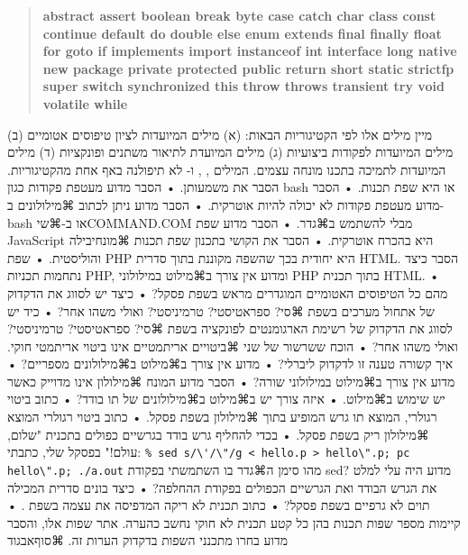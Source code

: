 \begin{quote}
\setLTR
\listingsfont\bfseries
abstract assert boolean break byte case catch char class const continue
default do double else enum extends final finally float for goto if
implements import instanceof int interface long native new package private
protected public return short static strictfp super switch synchronized
this throw throws transient try void volatile while
\end{quote}
מיין מילים אלו לפי הקטיגוריות הבאות: (א) מילים המיועדות לציון טיפוסים אטומיים (ב) מילים המיועדות לפקודות ביצועיות (ג) מילים המיועדת לתיאור משתנים ופונקציות (ד) מילים המיועדות לתמיכה בתכנו מונחה עצמים. המילים , ,  ו- לא תיפולנה באף אחת מהקטיגוריות. הסבר את משמעותן.
• הסבר מדוע מעטפת פקודות כגון bash או  היא שפת תכנות.
• הסבר מדוע מעטפת פקודות לא יכולה להיות אוטרקית.
• הסבר מדוע ניתן לכתוב ⌘מילולונים ב-bash או ב-⌘שי{COMMAND.COM} מבלי להשתמש ב⌘גדר.
• הסבר מדוע שפת JavaScript היא בהכרח אוטרקית.
• הסבר את הקושי בתכנון שפת תכנות ⌘מונח{יבילה} והוליסטית.
• שפת PHP היא יחודית בכך שהשפה מקוננת בתוך סדרית HTML. הסבר כיצד נתחמות תכניות PHP, ומדוע אין צורך ב⌘מילוט במילולוני PHP בתוך תכנית HTML.
• מהם כל הטיפוסים האטומיים המוגדרים מראש בשפת פסקל?
• כיצד יש לסווג את הדקדוק של אתחול מערכים בשפת ⌘סי? ספראטיסטי? טרמיניסטי? ואולי משהו אחר?
• כיד יש לסווג את הדקדוק של רשימת הארגומנטים לפונקציה בשפת ⌘סי? ספראטיסטי? טרמיניסטי? ואולי משהו אחר?
• הוכח ששרשור של שני ⌘ביטויים אריתמטיים אינו ביטוי אריתמטי חוקי. איך קשורה טענה זו לדקדוק ליברלי?
• מדוע אין צורך ב⌘מילוט ב⌘מילולונים מספריים?
• מדוע אין צורך ב⌘מילוט במילולוני שורה?
• הסבר מדוע המונח ⌘מילולון אינו מדוייק כאשר יש שימוש ב⌘מילוט.
• איזה צורך יש ב⌘מילוט ב⌘מילולונים של תו בודד?
• כתוב ביטוי רגולרי, המוצא תו גרש המופיע בתוך ⌘מילולון בשפת פסקל.
• כתוב ביטוי רגולרי המוצא ⌘מילולון ריק בשפת פסקל.
• בכדי להחליף גרש בודד בגרשיים כפולים בתכנית "שלום, עולם!" בפסקל שלי,
כתבתי:
\let\ttfamily=\listingsfont\setLTR
\verb+% sed s/\'/\"/g < hello.p > hello\".p; pc hello\".p; ./a.out+
מהו סימן ה⌘גדר בו השתמשתי בפקודת sed? מדוע היה עלי למלט את הגרש הבודד ואת הגרשיים הכפולים בפקודת ההחלפה? 
• כיצד בונים סדרית המכילה תוים לא גרפיים בשפת פסקל?
• כתוב תכנית לא ריקה המדפיסה את עצמה בשפת .
• קיימות מספר שפות תכנות בהן כל קטע תכנית לא חוקי נחשב כהערה. אתר שפות אלו, והסבר מדוע בחרו מתכנני השפות בדקדוק הערות זה.
⌘סוף{אבגוד}
